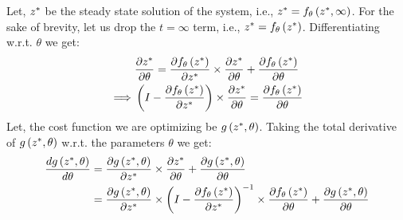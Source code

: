 Let, $z^*$ be the steady state solution of the system, i.e., $z^* = f_\theta\left(z^*, \infty\right)$. For the sake of brevity, let us drop the $t = \infty$ term, i.e., $z^* = f_\theta\left(z^*\right)$. Differentiating w.r.t. $\theta$ we get:
%
\begin{align}
           & \frac{\partial z^*}{\partial \theta} = \frac{\partial f_\theta\left(z^*\right)}{\partial z^*} \times \frac{\partial z^*}{\partial \theta} + \frac{\partial f_\theta\left(z^*\right)}{\partial \theta}\\
  \implies & \left( I - \frac{\partial f_\theta\left(z^*\right)}{\partial z^*} \right) \times \frac{\partial z^*}{\partial \theta} = \frac{\partial f_\theta\left(z^*\right)}{\partial \theta}
\end{align}
%
Let, the cost function we are optimizing be $g\left(z^*, \theta\right)$. Taking the total derivative of $g\left(z^*, \theta\right)$ w.r.t. the parameters $\theta$ we get:
%
\begin{align}
  \frac{d g\left(z^*, \theta\right)}{d \theta} &= \frac{\partial g\left(z^*, \theta\right)}{\partial z^*} \times \frac{\partial z^*}{\partial \theta} + \frac{\partial g\left(z^*, \theta\right)}{\partial \theta}\\
  &= \frac{\partial g\left(z^*, \theta\right)}{\partial z^*} \times \left( I - \frac{\partial f_\theta\left(z^*\right)}{\partial z^*} \right)^{-1} \times \frac{\partial f_\theta\left(z^*\right)}{\partial \theta} + \frac{\partial g\left(z^*, \theta\right)}{\partial \theta} \label{eq:ss_gradient}
\end{align}
%
%
